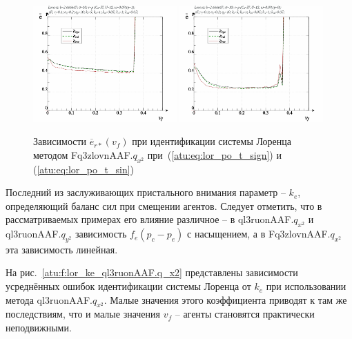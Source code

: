 \begin{figure}[ht!]
  \centerline{
    \includegraphics[width=0.49\textwidth]{p/cha/lor/Fq3zlovnAAF/lor_Fq3zlovnAAF_qx2-p_v_f_e_sign.png}
    \hfill
    \includegraphics[width=0.49\textwidth]{p/cha/lor/Fq3zlovnAAF/lor_Fq3zlovnAAF_qx2-p_v_f_e_sin.png}
  }
  \caption{Зависимости $\overline{e}_{r*}(v_f)$ при идентификации системы Лоренца методом Fq3zlovnAAF.$q_{x^2}$
   при~(\ref{atu:eq:lor_po_t_sign}) и (\ref{atu:eq:lor_po_t_sin})}
  \label{atu:f:lor_vf_Fq3zlovnAAF.q_x2}
\end{figure}

Последний из заслуживающих пристального внимания параметр -- $k_e$,
определяющий баланс сил при смещении агентов.
Следует отметить, что в рассматриваемых примерах его влияние различное --
в ql3ruonAAF.$q_{x^2}$ и ql3ruonAAF.$q_{y^2}$
зависимость $f_e(p_c-p_e)$ с насыщением,
а в Fq3zlovnAAF.$q_{x^2}$ эта зависимость линейная.

На рис.~\ref{atu:f:lor_ke_ql3ruonAAF.q_x2} представлены зависимости
усреднённых ошибок идентификации системы Лоренца от $k_e$ при использовании метода ql3ruonAAF.$q_{x^2}$.
Малые значения этого коэффициента приводят к там же последствиям, что и малые
значения $v_f$ -- агенты становятся практически неподвижными.

